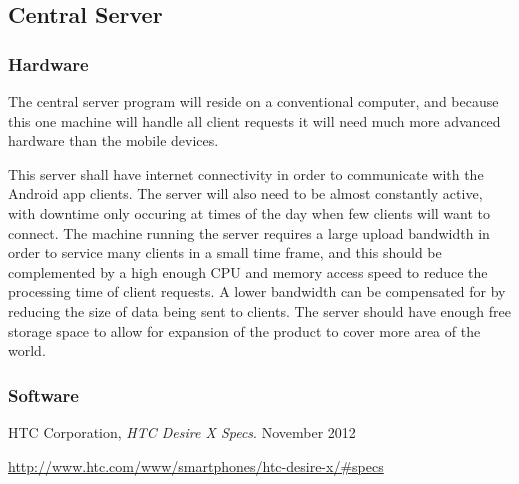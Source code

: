 \documentclass[a4paper]{article}
\begin{document}
		\subsection{Central Server}
			\subsubsection{Hardware}
				The central server program will reside on a conventional computer, and because this one machine will handle all client requests it will need much more advanced hardware than the mobile devices.

				This server shall have internet connectivity in order to communicate with the Android app clients. The server will also need to be almost constantly active, with downtime only occuring at times of the day when few clients will want to connect. The machine running the server requires a large upload bandwidth in order to service many clients in a small time frame, and this should be complemented by a high enough CPU and memory access speed to reduce the processing time of client requests. A lower bandwidth can be compensated for by reducing the size of data being sent to clients. The server should have enough free storage space to allow for expansion of the product to cover more area of the world.
			\subsubsection{Software}
	\begin{thebibliography}{9}
			HTC Corporation,
			\emph{HTC Desire X Specs}.
			November 2012

			\url{http://www.htc.com/www/smartphones/htc-desire-x/#specs}
	\end{thebibliography}
\end{document}

